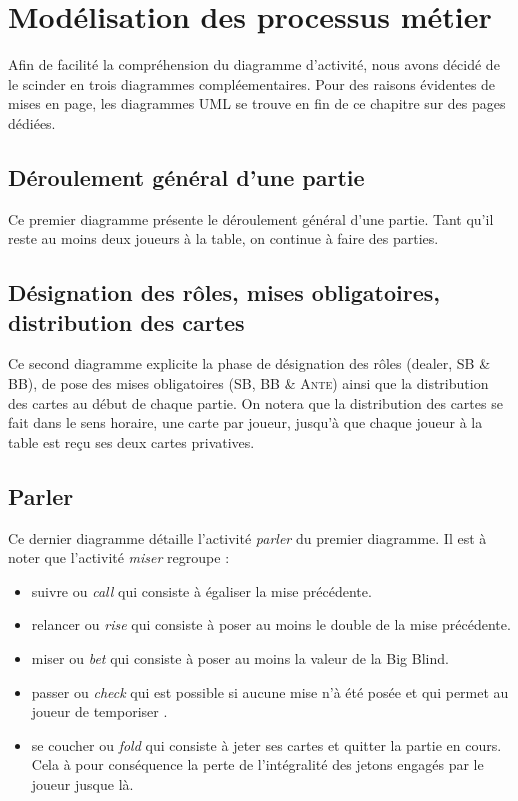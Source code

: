
\section{Modélisation des processus métier}
Afin de facilité la compréhension du diagramme d'activité, nous avons décidé de 
le scinder en trois diagrammes compléementaires. Pour des raisons évidentes de
mises en page, les diagrammes UML se trouve en fin de ce chapitre sur des pages
dédiées.

\subsection{Déroulement général d'une partie}
Ce premier diagramme présente le déroulement général d'une partie. Tant qu'il 
reste au moins deux joueurs à la table, on continue à faire des parties.

\subsection{Désignation des rôles, mises obligatoires, distribution des cartes}
Ce second diagramme explicite la phase de désignation des rôles (dealer, SB \& 
BB), de pose des mises obligatoires (SB, BB \& \textsc{Ante}) ainsi que la 
distribution des cartes au début de chaque partie. On notera que la distribution
des cartes se fait dans le sens horaire, une carte par joueur, jusqu'à que 
chaque joueur à la table est reçu ses deux cartes privatives.

\subsection{Parler}
Ce dernier diagramme détaille l'activité \textit{parler} du premier diagramme.
Il est à noter que l'activité \textit{miser} regroupe :

\begin{itemize}
	\item suivre ou \textit{call} qui consiste à égaliser la mise précédente.
	\item relancer ou \textit{rise} qui consiste à poser au moins le double de 
	      la mise précédente.
	\item miser ou \textit{bet} qui consiste à poser au moins la valeur de la 
	      Big Blind.
	\item passer ou \textit{check} qui est possible si aucune mise n'à été 
	      posée et qui permet au joueur de \og temporiser \fg.
	\item se coucher ou \textit{fold} qui consiste à jeter ses cartes et quitter 
	      la partie en cours. Cela à pour conséquence la perte de l'intégralité 
	      des jetons engagés par le joueur jusque là.
\end{itemize}

